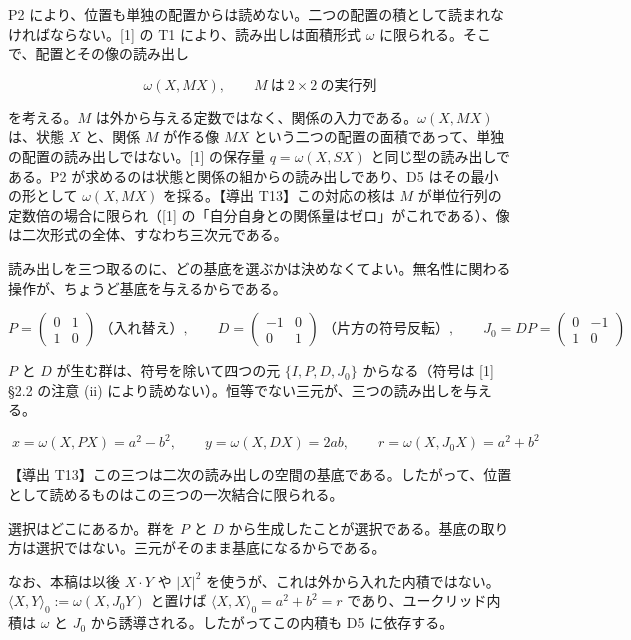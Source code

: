 \documentclass[
  a4paper,
]{ltjsarticle}
\begin{document}
P2
により、位置も単独の配置からは読めない。二つの配置の積として読まれなければならない。{[}1{]}
の T1 により、読み出しは面積形式 \(\omega\)
に限られる。そこで、配置とその像の読み出し

\[
\omega(X,MX),\qquad M\ \text{は}\ 2\times2\ \text{の実行列}
\]

を考える。\(M\)
は外から与える定数ではなく、関係の入力である。\(\omega(X,MX)\) は、状態
\(X\) と、関係 \(M\) が作る像 \(MX\)
という二つの配置の面積であって、単独の配置の読み出しではない。{[}1{]}
の保存量 \(q=\omega(X,SX)\) と同じ型の読み出しである。P2
が求めるのは状態と関係の組からの読み出しであり、D5 はその最小の形として
\(\omega(X,MX)\) を採る。【導出 T13】この対応の核は \(M\)
が単位行列の定数倍の場合に限られ（{[}1{]}
の「自分自身との関係量はゼロ」がこれである）、像は二次形式の全体、すなわち三次元である。

読み出しを三つ取るのに、どの基底を選ぶかは決めなくてよい。無名性に関わる操作が、ちょうど基底を与えるからである。

\[
P=\begin{pmatrix}0&1\\1&0\end{pmatrix}\ \text{（入れ替え）},\qquad
D=\begin{pmatrix}-1&0\\0&1\end{pmatrix}\ \text{（片方の符号反転）},\qquad
J_0=DP=\begin{pmatrix}0&-1\\1&0\end{pmatrix}
\]

\(P\) と \(D\) が生む群は、符号を除いて四つの元 \(\{I,P,D,J_0\}\)
からなる（符号は {[}1{]} §2.2 の注意 (ii)
により読めない）。恒等でない三元が、三つの読み出しを与える。

\[
\boxed{\;x=\omega(X,PX)=a^2-b^2,\qquad y=\omega(X,DX)=2ab,\qquad r=\omega(X,J_0X)=a^2+b^2\;}
\]

【導出
T13】この三つは二次の読み出しの空間の基底である。したがって、位置として読めるものはこの三つの一次結合に限られる。

選択はどこにあるか。群を \(P\) と \(D\)
から生成したことが選択である。基底の取り方は選択ではない。三元がそのまま基底になるからである。

なお、本稿は以後 \(X\cdot Y\) や \(\lvert X\rvert^2\)
を使うが、これは外から入れた内積ではない。\(\langle X,Y\rangle_0:=\omega(X,J_0Y)\)
と置けば \(\langle X,X\rangle_0=a^2+b^2=r\) であり、ユークリッド内積は
\(\omega\) と \(J_0\) から誘導される。したがってこの内積も D5
に依存する。
\end{document}
